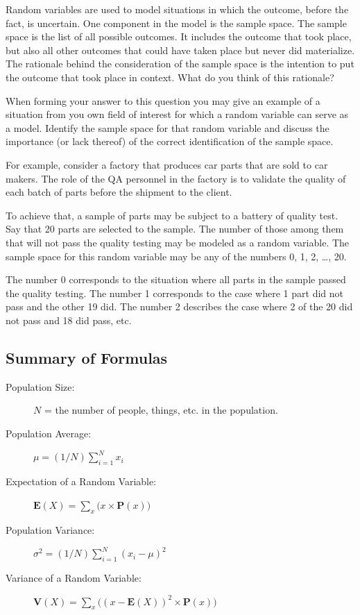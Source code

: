 \documentclass[
]{krantz}
\newcommand{\Expec}{\mathbf{E}}
\newcommand{\Prob}{\mathbf{P}}
\newcommand{\Var}{\mathbf{V}}
\theoremstyle{definition}
\theoremstyle{definition}
\theoremstyle{definition}
\theoremstyle{remark}
\begin{document}
Random variables are used to model situations in which the outcome,
before the fact, is uncertain. One component in the model is the sample
space. The sample space is the list of all possible outcomes. It
includes the outcome that took place, but also all other outcomes that
could have taken place but never did materialize. The rationale behind
the consideration of the sample space is the intention to put the
outcome that took place in context. What do you think of this rationale?

When forming your answer to this question you may give an example of a
situation from you own field of interest for which a random variable can
serve as a model. Identify the sample space for that random variable and
discuss the importance (or lack thereof) of the correct identification
of the sample space.

For example, consider a factory that produces car parts that are sold to
car makers. The role of the QA personnel in the factory is to validate
the quality of each batch of parts before the shipment to the client.

To achieve that, a sample of parts may be subject to a battery of
quality test. Say that 20 parts are selected to the sample. The number
of those among them that will not pass the quality testing may be
modeled as a random variable. The sample space for this random variable
may be any of the numbers 0, 1, 2, \ldots{}, 20.

The number 0 corresponds to the situation where all parts in the sample
passed the quality testing. The number 1 corresponds to the case where 1
part did not pass and the other 19 did. The number 2 describes the case
where 2 of the 20 did not pass and 18 did pass, etc.

\hypertarget{summary-of-formulas}{%
\subsection*{Summary of Formulas}\label{summary-of-formulas}}


\begin{description}
\item[Population Size:]
\(N\) = the number of people, things, etc. in the population.
\item[Population Average:]
\(\mu = (1/N)\sum_{i=1}^N x_i\)
\item[Expectation of a Random Variable:]
\(\Expec(X) = \sum_x \big(x \times \Prob(x)\big)\)
\item[Population Variance:]
\(\sigma^2 = (1/N)\sum_{i=1}^N (x_i-\mu)^2\)
\item[Variance of a Random Variable:]
\(\Var(X) = \sum_x\big( (x-\Expec(X))^2 \times \Prob(x)\big)\)
\end{description}
\end{document}
